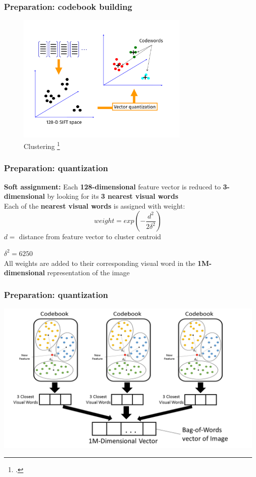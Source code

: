 \begin{frame}
    \frametitle{Preparation: codebook building}
    \begin{figure}
        \centering
        \includegraphics[width=3.3in]{images/cluster.pdf}
        \caption{Clustering \footcite{Slide credit: Josef Sivic}}
    \end{figure}
\end{frame}

\begin{frame}
    \frametitle{Preparation: quantization}
    \textbf{Soft assignment:} Each \textbf{128-dimensional} feature vector is reduced to \textbf{3-dimensional} by looking for its \textbf{3 nearest visual words}\\
    Each of the \textbf{nearest visual words} is assigned with \alert{weight}:
    \begin{equation*}
        weight = exp(-\frac{d^2}{2\delta^2})
    \end{equation*}
\hspace{4ex} $d = $ distance from feature vector to cluster centroid

\hspace{4ex} $\delta^2 = 6250$\\

    All weights are added to their corresponding visual word in the \textbf{1M-dimensional} representation of the image
\end{frame}


\begin{frame}
    \frametitle{Preparation: quantization}
    \begin{center}
    \includegraphics[width=\textwidth]{images/quantization.png}
    \end{center}
\end{frame}


